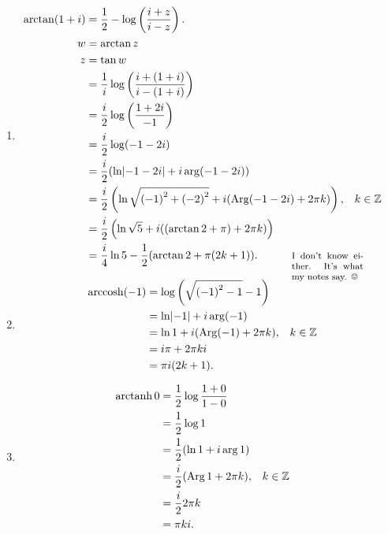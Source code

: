 \documentclass{tufte-handout}
\DeclareMathOperator{\Arg}{Arg}
\DeclareMathOperator{\arccosh}{arccosh}
\DeclareMathOperator{\arctanh}{arctanh}
\DeclarePairedDelimiter\abs{\lvert}{\rvert}%
\def\mathnote#1{%
  \tag*{\rlap{\hspace\marginparsep\smash{\parbox[t]{\marginparwidth}{%
  \footnotesize#1}}}}
}
\begin{document}
\begin{enumerate}[label=(\alph*)]
\item
  \begin{align*}
    \arctan (1 + i)
    &= {1 \over 2} - \log\left( {i + z \over i - z}
      \right).\\
    w &= \arctan z\\
    z &= \tan w\\
    &= {1 \over i} \log \left( {i + (1 + i) \over i - (1 + i)}
      \right)\\
    &= {i \over 2} \log \left( { 1 + 2i \over -1 } \right)\\
    &= {i \over 2} \log(-1 - 2i)\\
    &= {i \over 2}(\ln\abs{-1 - 2i} + i \arg(-1 - 2i))\\
    &= {i \over 2}\left(\ln \sqrt{{(-1)}^2 + {(-2)}^2} + i(\Arg(-1 - 2i) +
      2 \pi k)\right), && k \in \mathbb{Z}\\
    &= {i \over 2}\left( \ln \sqrt 5 + i ((\arctan 2 + \pi) + 2\pi k) \right)\\
    &= {i \over 4} \ln 5 - {1 \over 2} (\arctan 2 + \pi ( 2k +
      1)).\mathnote{ I don't know either. It's what my notes say. \smiley{} }
  \end{align*}
\item
  \begin{align*}
    \arccosh(-1) &= \log\left(\sqrt{{(-1)}^2 - 1} - 1 \right)\\
                 &= \ln \abs{-1} + i \arg(-1)\\
                 &= \ln 1 + i(\Arg(-1) + 2 \pi k), && k \in \mathbb{Z}\\
                 &= i \pi + 2 \pi k i\\
                 &= \pi i (2k + 1).
  \end{align*}
\item
  \begin{align*}
    \arctanh 0 &= {1 \over 2} \log {1 + 0 \over 1 - 0}\\
               &= {1 \over 2} \log 1\\
               &= {1 \over 2}( \ln 1 + i \arg 1 )\\
               &= {i \over 2}(\Arg 1 + 2 \pi k), && k \in
                                                       \mathbb{Z}\\
               &= {i \over 2}2 \pi k\\
               &= \pi k i.
  \end{align*}
\end{enumerate}
\end{document}
